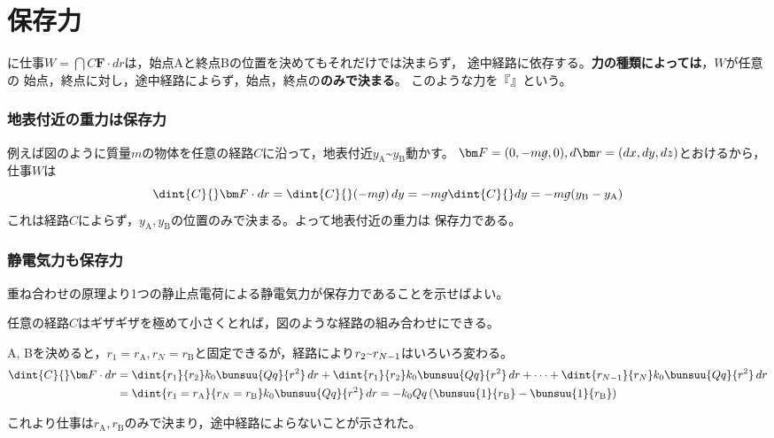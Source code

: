  \section{保存力}

 に仕事$W=\dint{C}{}\bm F\cdot dr$は，始点Aと終点Bの位置を決めてもそれだけでは決まらず，
 途中経路に依存する。{\bfseries 力の種類によっては}，$W$が任意の
 始点，終点に対し，途中経路によらず，始点，終点の{\bfseries {}のみで決まる}。
 このような力を『』という。
   \subsubsection{地表付近の重力は保存力}

   例えば図のように質量$m$の物体を任意の経路$C$に沿って，地表付近$y_\text{A}\text{\textasciitilde} y_\text{B}$動かす。%
   $\bm F=(0,-m\varg,0), d\bm r=(dx,dy,dz)$とおけるから，仕事$W$は
   $$\dint{C}{}\bm F\cdot dr=\dint{C}{}(-m\varg)\,dy\\
   =-m\varg\dint{C}{}dy=-m\varg(y_\text{B}-y_\text{A})$$
   これは経路$C$によらず，$y_\text{A}, y_\text{B}$の位置のみで決まる。よって地表付近の重力は
   保存力である。

   \subsubsection{静電気力も保存力}

   重ね合わせの原理より1つの静止点電荷による静電気力が保存力であることを示せばよい。

   任意の経路$C$はギザギザを極めて小さくとれば，図のような経路の組み合わせにできる。

   A, Bを決めると，$r_1=r_\text{A}, r_N=r_\text{B}$と固定できるが，経路により$r_2\text\textasciitilde r_{N-1}$はいろいろ変わる。
   \begin{align*}
    \dint{C}{}\bm F\cdot dr&=\dint{r_1}{r_2}k_0\bunsuu{Qq}{r^2}\,dr+\dint{r_1}{r_2}k_0\bunsuu{Qq}{r^2}\,dr+\dots +\dint{r_{N-1}}{r_N}k_0\bunsuu{Qq}{r^2}\,dr\\
    {}&=\dint{r_1=r_\text{A}}{r_N=r_\text{B}}k_0\bunsuu{Qq}{r^2}\,dr=-k_0Qq\left(\bunsuu{1}{r_\text{B}}-\bunsuu{1}{r_\text{B}}\right)
   \end{align*}

   これより仕事は$r_\text{A}, r_\text{B}$のみで決まり，途中経路によらないことが示された。

